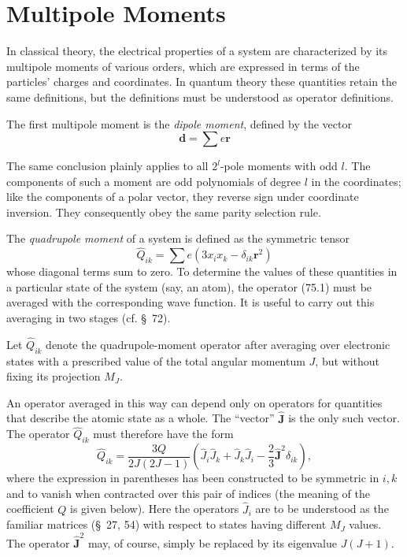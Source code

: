 \section{Multipole Moments}

In classical theory, the electrical properties of a system are characterized by its multipole moments of various orders, which are expressed in terms of the particles' charges and coordinates. In quantum theory these quantities retain the same definitions, but the definitions must be understood as operator definitions.

The first multipole moment is the \emph{dipole moment}, defined by the vector
\[
 \mathbf d=\sum e\mathbf r
\]


The same conclusion plainly applies to all $2^l$-pole moments with odd $l$. The components of such a moment are odd polynomials of degree $l$ in the coordinates; like the components of a polar vector, they reverse sign under coordinate inversion. They consequently obey the same parity selection rule.

The \emph{quadrupole moment} of a system is defined as the symmetric tensor
\begin{equation}
 \widehat Q_{ik}=\sum e(3x_i x_k-\delta_{ik}\mathbf r^2)
 \tag{75.1}
\end{equation}
whose diagonal terms sum to zero. To determine the values of these quantities in a particular state of the system (say, an atom), the operator (75.1) must be averaged with the corresponding wave function. It is useful to carry out this averaging in two stages (cf. \S~72).

Let $\widehat Q_{ik}$ denote the quadrupole-moment operator after averaging over electronic states with a prescribed value of the total angular momentum $J$, but without fixing its projection $M_J$.

An operator averaged in this way can depend only on operators for quantities that describe the atomic state as a whole. The ``vector'' $\widehat{\mathbf J}$ is the only such vector. The operator $\widehat Q_{ik}$ must therefore have the form
\begin{equation}
 \widehat Q_{ik}=\frac{3Q}{2J(2J-1)}\left(\widehat J_i\widehat J_k+\widehat J_k\widehat J_i-\frac23\widehat{\mathbf J}^{2}\delta_{ik}\right),
 \tag{75.2}
\end{equation}
where the expression in parentheses has been constructed to be symmetric in $i,k$ and to vanish when contracted over this pair of indices (the meaning of the coefficient $Q$ is given below). Here the operators $\widehat J_i$ are to be understood as the familiar matrices (\S~27, 54) with respect to states having different $M_J$ values. The operator $\widehat{\mathbf J}^{2}$ may, of course, simply be replaced by its eigenvalue $J(J+1)$.

